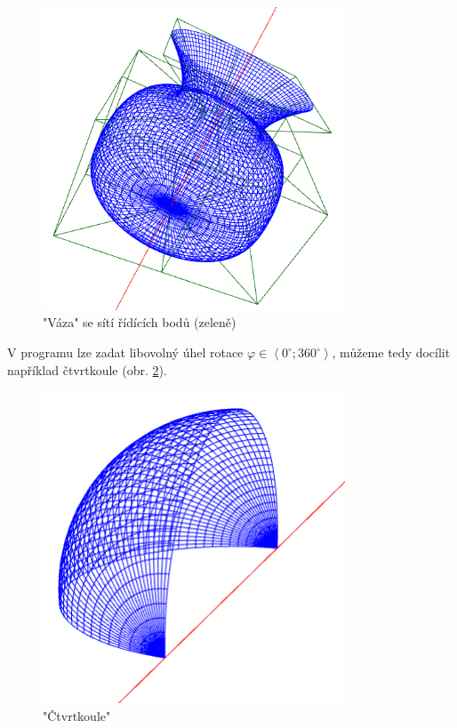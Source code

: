 \begin{figure}[!h]
\begin{center}
	\includegraphics*[width=9cm]{obr/vaza}
\end{center}
\caption{"Váza" se sítí řídících bodů (zeleně)}
\label{obrVaza}
\end{figure}

V programu lze zadat libovolný úhel rotace $\varphi\in\left\langle 0^\circ;360^\circ \right\rangle$, můžeme tedy docílit například čtvrtkoule (obr. \ref{obrCtvrt}). 

\begin{figure}[!h]
	\begin{center}
		\includegraphics*[width=9cm]{obr/ctvrtkoule}
	\end{center}
	\caption{"Čtvrtkoule"}
	\label{obrCtvrt}
\end{figure}


\clearpage
